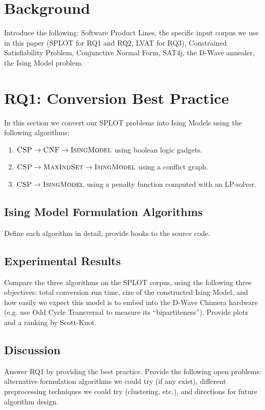 \documentclass{sig-alternate-05-2015}
\begin{document}
\section{Background}
Introduce the following: Software Product Lines, the specific input corpus we use in this paper (SPLOT for RQ1 and RQ2, LVAT for RQ3), Constrained Satisfiability Problem, Conjunctive Normal Form, SAT4j, the D-Wave annealer, the Ising Model problem.

\section{RQ1: Conversion Best Practice}
In this section we convert our SPLOT problems into Ising Models using the following algorithms:
\begin{enumerate}
\item $\textsc{CSP} \to \textsc{CNF} \to \textsc{IsingModel}$ using boolean logic gadgets.
\item $\textsc{CSP} \to \textsc{MaxIndSet} \to \textsc{IsingModel}$ using a conflict graph.
\item $\textsc{CSP} \to \textsc{IsingModel}$ using a penalty function computed with an LP-solver.
\end{enumerate}

\subsection{Ising Model Formulation Algorithms}
Define each algorithm in detail, provide hooks to the source code.

\subsection{Experimental Results}
Compare the three algorithms on the SPLOT corpus, using the following three objectives: total conversion run time, size of the constructed Ising Model, and how easily we expect this model is to embed into the D-Wave Chimera hardware (e.g. use Odd Cycle Transversal to measure its ``bipartiteness''). Provide plots and a ranking by Scott-Knot.

\subsection{Discussion}
Answer RQ1 by providing the best practice. Provide the following open problems: alternative formulation algorithms we could try (if any exist), different preprocessing techniques we could try (clustering, etc.), and directions for future algorithm design.
\end{document}

